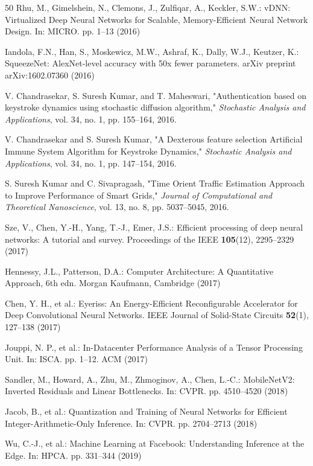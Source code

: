 \documentclass[conference]{IEEEtran}
\begin{document}
\begin{thebibliography}{50}
 Rhu, M., Gimelshein, N., Clemons, J., Zulfiqar, A., Keckler, S.W.: vDNN: Virtualized Deep Neural Networks for Scalable, Memory-Efficient Neural Network Design. In: MICRO. pp. 1--13 (2016)

 Iandola, F.N., Han, S., Moskewicz, M.W., Ashraf, K., Dally, W.J., Keutzer, K.: SqueezeNet: AlexNet-level accuracy with 50x fewer parameters. arXiv preprint arXiv:1602.07360 (2016)

 V. Chandrasekar, S. Suresh Kumar, and T. Maheswari, "Authentication based on keystroke dynamics using stochastic diffusion algorithm," \textit{Stochastic Analysis and Applications}, vol. 34, no. 1, pp. 155--164, 2016.

 V. Chandrasekar and S. Suresh Kumar, "A Dexterous feature selection Artificial Immune System Algorithm for Keystroke Dynamics," \textit{Stochastic Analysis and Applications}, vol. 34, no. 1, pp. 147--154, 2016.

 S. Suresh Kumar and C. Sivapragash, "Time Orient Traffic Estimation Approach to Improve Performance of Smart Grids," \textit{Journal of Computational and Theoretical Nanoscience}, vol. 13, no. 8, pp. 5037--5045, 2016.

 Sze, V., Chen, Y.-H., Yang, T.-J., Emer, J.S.: Efficient processing of deep neural networks: A tutorial and survey. Proceedings of the IEEE \textbf{105}(12), 2295--2329 (2017)

 Hennessy, J.L., Patterson, D.A.: Computer Architecture: A Quantitative Approach, 6th edn. Morgan Kaufmann, Cambridge (2017)

 Chen, Y. H., et al.: Eyeriss: An Energy-Efficient Reconfigurable Accelerator for Deep Convolutional Neural Networks. IEEE Journal of Solid-State Circuits \textbf{52}(1), 127--138 (2017)

 Jouppi, N. P., et al.: In-Datacenter Performance Analysis of a Tensor Processing Unit. In: ISCA. pp. 1--12. ACM (2017)

 Sandler, M., Howard, A., Zhu, M., Zhmoginov, A., Chen, L.-C.: MobileNetV2: Inverted Residuals and Linear Bottlenecks. In: CVPR. pp. 4510--4520 (2018)

 Jacob, B., et al.: Quantization and Training of Neural Networks for Efficient Integer-Arithmetic-Only Inference. In: CVPR. pp. 2704--2713 (2018)

 Wu, C.-J., et al.: Machine Learning at Facebook: Understanding Inference at the Edge. In: HPCA. pp. 331--344 (2019)


\end{thebibliography}
\end{document}
